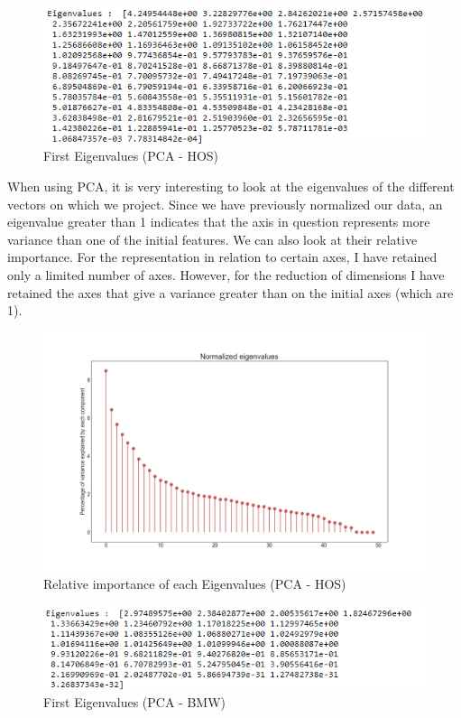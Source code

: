 \documentclass[15pt]{article}
\begin{document}
\begin{multicols}{2}
\begin{figure}[H]
\centering
\includegraphics[width = \columnwidth]{eigenpcahos.png}
\caption{First Eigenvalues (PCA - HOS)}
\end{figure}

When using PCA, it is very interesting to look at the eigenvalues of the different vectors on which we project. Since we have previously normalized our data, an eigenvalue greater than 1 indicates that the axis in question represents more variance than one of the initial features. We can also look at their relative importance. For the representation in relation to certain axes, I have retained only a limited number of axes. However, for the reduction of dimensions I have retained the axes that give a variance greater than on the initial axes (which are 1).

\begin{figure}[H]
\centering
\includegraphics[width = \columnwidth]{egvHOSpca.png}
\caption{Relative importance of each Eigenvalues (PCA - HOS)}
\end{figure}

\begin{figure}[H]
\centering
\includegraphics[width = \columnwidth]{eigenpcabmw.png}
\caption{First Eigenvalues (PCA - BMW)}
\end{figure}


\end{multicols}
\end{document}
